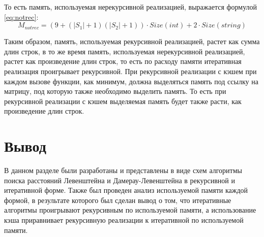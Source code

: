 То есть память, используемая нерекурсивной реализацией, выражается формулой
\ref{eq:notrec}:
\begin{equation}\label{eq:notrec}
    M_{notrec} = (9 + (|S_1| + 1)(|S_2| + 1)) \cdot Size(int)
                 + 2 \cdot Size(string)
\end{equation}

Таким образом, память, используемая рекурсивной реализацией, растет как сумма
длин строк, в то же время память, используемая нерекурсивной реализацией,
растет как произведение длин строк, то есть по расходу памяти итеративная
реализация проигрывает рекурсивной. При рекурсивной реализации с кэшем при
каждом вызове функции, как минимум, должна выделяться память под ссылку на
матрицу, под которую также необходимо выделить память. То есть при рекурсивной
реализации с кэшем выделяемая память будет также расти, как произведение длин
строк.

\section{Вывод}

В данном разделе были разработаны и представлены в виде схем алгоритмы поиска
расстояний Левенштейна и Дамерау-Левенштейна в рекурсивной и итеративной форме.
Также был проведен анализ используемой памяти каждой формой, в результате
которого был сделан вывод о том, что итеративные алгоритмы проигрывают
рекурсивным по используемой памяти, а использование кэша приравнивает
рекурсивную реализации к итеративной по используемой памяти.
